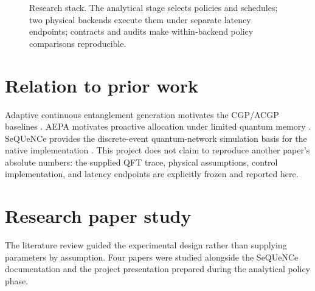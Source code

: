 \documentclass[11pt,a4paper]{report}
\begin{document}
\begin{figure}[htbp]
\centering
{}
\caption{Research stack. The analytical stage selects policies and schedules;
two physical backends execute them under separate latency endpoints; contracts
and audits make within-backend policy comparisons reproducible.}
\label{fig:research-stack}
\end{figure}

\section{Relation to prior work}
Adaptive continuous entanglement generation motivates the CGP/ACGP baselines
\cite{Kolar2022}. AEPA motivates proactive allocation under limited quantum
memory \cite{AEPA}. SeQUeNCe provides the discrete-event quantum-network
simulation basis for the native implementation \cite{SeQUeNCe}. This project
does not claim to reproduce another paper's absolute numbers: the supplied QFT
trace, physical assumptions, control implementation, and latency endpoints are
explicitly frozen and reported here.

\section{Research paper study}
The literature review guided the experimental design rather than supplying
parameters by assumption. Four papers were studied alongside the SeQUeNCe
documentation and the project presentation prepared during the analytical
policy phase.
\end{document}
